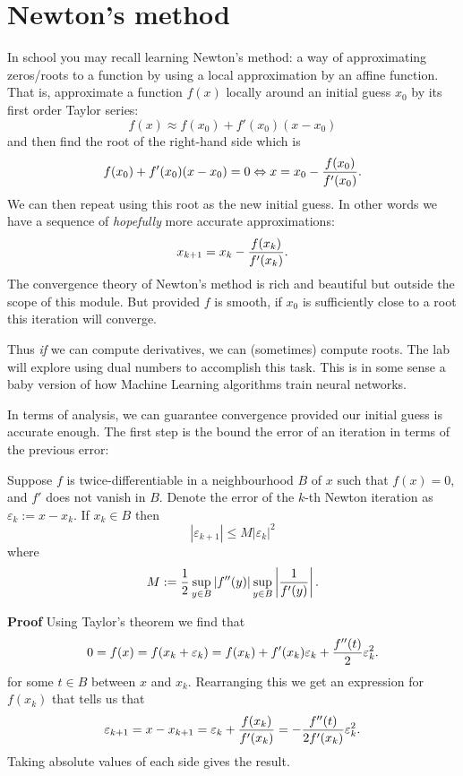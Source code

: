 
\section{Newton's method}
In school you may recall learning Newton's method: a way of approximating zeros/roots to a function by using a local approximation by an affine function. That is, approximate a function $f(x)$ locally around an initial guess $x_0$ by its first order Taylor series:
\[
f(x) \ensuremath{\approx} f(x_0) + f'(x_0) (x-x_0)
\]
and then find the root of the right-hand side which is
\[
 f(x_0) + f'(x_0) (x-x_0) = 0 \ensuremath{\Leftrightarrow} x = x_0 - {f(x_0) \over f'(x_0)}.
\]
We can then repeat using this root as the new initial guess. In other words we have a sequence of \emph{hopefully} more accurate approximations:
\[
x_{k+1} = x_k - {f(x_k) \over f'(x_k)}.
\]
The convergence theory of Newton's method is rich and beautiful but outside the scope of this module. But provided $f$ is smooth, if $x_0$ is sufficiently close to a root this iteration will converge. 

Thus \emph{if} we can compute derivatives, we can (sometimes) compute roots. The lab will explore using dual numbers to accomplish this task. This is in some sense a baby version of how Machine Learning algorithms train neural networks.

In terms of analysis, we can guarantee convergence provided our initial guess is accurate enough. The first step is the bound the error of an iteration in terms of the previous error:

\begin{theorem} Suppose $f$ is twice-differentiable in a neighbourhood $B$ of $x$  such that $f(x) = 0$, and $f'$ does not vanish in $B$. Denote the error of the $k$-th Newton iteration as $\ensuremath{\varepsilon}_k := x - x_k$. If $x_k \ensuremath{\in} B$ then
\[
|\ensuremath{\varepsilon}_{k+1}| \ensuremath{\leq} M |\ensuremath{\varepsilon}_k|^2
\]
where
\[
M := {1 \over 2} \sup_{y \ensuremath{\in} B}  | f''(y)|   \sup_{y \ensuremath{\in} B} \left| {1 \over f'(y)} \right|.
\]
\end{theorem}
\textbf{Proof} Using Taylor's theorem we find that
\[
0 = f(x) = f(x_k + \ensuremath{\varepsilon}_k) = f(x_k) + f'(x_k) \ensuremath{\varepsilon}_k + {f''(t) \over 2} \ensuremath{\varepsilon}_k^2.
\]
for some $t \ensuremath{\in} B$ between $x$ and $x_k$.  Rearranging this we get an expression for $f(x_k)$ that tells us that
\[
\ensuremath{\varepsilon}_{k+1} = x - x_{k+1} = \ensuremath{\varepsilon}_k +  {f(x_k) \over f'(x_k)} = -{f''(t) \over 2f'(x_k)} \ensuremath{\varepsilon}_k^2.
\]
Taking absolute values of each side gives the result.

